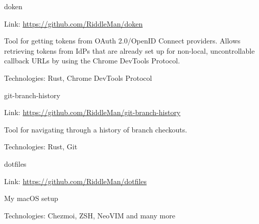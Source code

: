 

\begin{cventries}

  \cventry
    {}
    {doken}
    {}
    {}
    {
      \begin{cvitems} %
        \item {Link: \href{https://github.com/RiddleMan/doken}{https://github.com/RiddleMan/doken}}
        \item {Tool for getting tokens from OAuth 2.0/OpenID Connect providers. Allows retrieving tokens from IdPs that are already set up for non-local, uncontrollable callback URLs by using the Chrome DevTools Protocol.}
        \item {Technologies: Rust, Chrome DevTools Protocol}
      \end{cvitems}
    }

  \cventry
    {}
    {git-branch-history}
    {}
    {}
    {
      \begin{cvitems} %
        \item {Link: \href{https://github.com/RiddleMan/git-branch-history}{https://github.com/RiddleMan/git-branch-history}}
        \item {Tool for navigating through a history of branch checkouts.}
        \item {Technologies: Rust, Git}
      \end{cvitems}
    }

  \cventry
    {}
    {dotfiles}
    {}
    {}
    {
      \begin{cvitems} %
        \item {Link: \href{https://github.com/RiddleMan/dotfiles}{https://github.com/RiddleMan/dotfiles}}
        \item {My macOS setup}
        \item {Technologies: Chezmoi, ZSH, NeoVIM and many more}
      \end{cvitems}
    }
\end{cventries}
